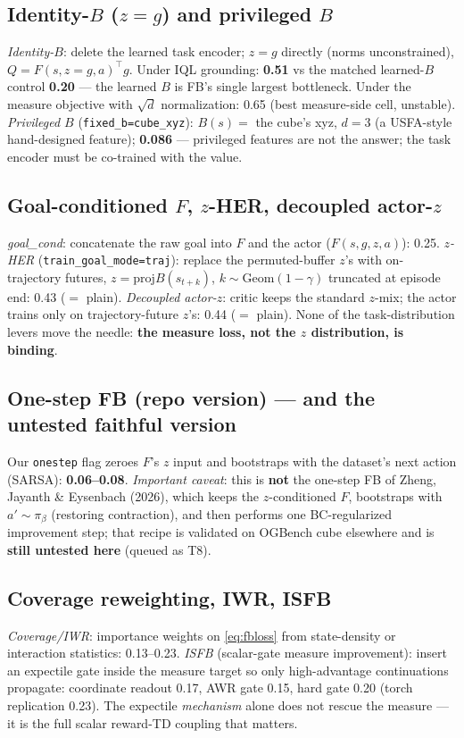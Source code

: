 \documentclass[11pt]{article}
\begin{document}
\subsection{Identity-$B$ ($z{=}g$) and privileged $B$}
\emph{Identity-$B$}: delete the learned task encoder; $z=g$ directly (norms unconstrained),
$Q=F(s,z{=}g,a)^\top g$. Under IQL grounding: \textbf{0.51} vs the matched learned-$B$ control
\textbf{0.20} --- the learned $B$ is FB's single largest bottleneck. Under the measure
objective with $\sqrt d$ normalization: 0.65 (best measure-side cell, unstable).
\emph{Privileged $B$} (\texttt{fixed\_b=cube\_xyz}): $B(s)=$ the cube's xyz, $d{=}3$
(a USFA-style hand-designed feature); \textbf{0.086} --- privileged features are not the
answer; the task encoder must be co-trained with the value.

\subsection{Goal-conditioned $F$, $z$-HER, decoupled actor-$z$}
\emph{goal\_cond}: concatenate the raw goal into $F$ and the actor ($F(s,g,z,a)$): 0.25.
\emph{$z$-HER} (\texttt{train\_goal\_mode=traj}): replace the permuted-buffer $z$'s with
on-trajectory futures, $z=\mathrm{proj}B(s_{t+k})$, $k\sim\mathrm{Geom}(1-\gamma)$ truncated
at episode end: 0.43 ($=$ plain). \emph{Decoupled actor-$z$}: critic keeps the standard
$z$-mix; the actor trains only on trajectory-future $z$'s: 0.44 ($=$ plain). None of the
task-distribution levers move the needle: \textbf{the measure loss, not the $z$
distribution, is binding}.

\subsection{One-step FB (repo version) --- and the untested faithful version}
Our \texttt{onestep} flag zeroes $F$'s $z$ input and bootstraps with the dataset's next
action (SARSA): \textbf{0.06--0.08}. \emph{Important caveat}: this is \textbf{not} the
one-step FB of Zheng, Jayanth \& Eysenbach (2026), which keeps the $z$-conditioned $F$,
bootstraps with $a'\sim\pi_\beta$ (restoring contraction), and then performs one
BC-regularized improvement step; that recipe is validated on OGBench cube elsewhere and is
\textbf{still untested here} (queued as T8).

\subsection{Coverage reweighting, IWR, ISFB}
\emph{Coverage/IWR}: importance weights on \eqref{eq:fbloss} from state-density or
interaction statistics: 0.13--0.23. \emph{ISFB} (scalar-gate measure improvement): insert an
expectile gate inside the measure target so only high-advantage continuations propagate:
coordinate readout 0.17, AWR gate 0.15, hard gate 0.20 (torch replication 0.23). The
expectile \emph{mechanism} alone does not rescue the measure --- it is the full scalar
reward-TD coupling that matters.
\end{document}
